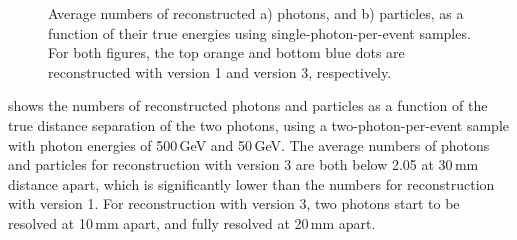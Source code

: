 \begin{figure}[tbph]
\begin{subfigure}[b]{0.45\textwidth}
        \caption{}
        \label{fig:photonSingleN_all}
    \end{subfigure}
\caption[Average number of reconstructed photons and reconstructed particles, as a function of their true energy using single photon sample.]
{Average numbers of reconstructed a) photons, and b) particles, as a function of their true energies using  single-photon-per-event samples. For both figures, the top orange and bottom blue dots are reconstructed with \pandora version 1 and version 3, respectively.}
\label{fig:photonSingleN}
\end{figure}


 shows the numbers of reconstructed photons and particles as a function of  the true distance separation of the two photons, using a two-photon-per-event sample with photon energies of  500\,GeV and 50\,GeV.  The average numbers of photons and particles for reconstruction with \pandora version 3 are both below 2.05 at 30\,mm distance apart, which is significantly lower than the numbers for reconstruction with \pandora version 1. For reconstruction with \pandora version 3, two photons start to be resolved at 10\,mm apart, and fully resolved at 20\,mm apart.






